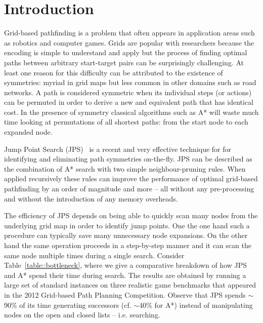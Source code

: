 \section{Introduction}
\label{sec::introduction}
Grid-based pathfinding is a problem that often
appears in application areas such as robotics and computer games. 
Grids are popular with researchers because the encoding is
simple to understand and apply but the process of finding optimal paths
between arbitrary start-target pairs can be surprisingly challenging. At least
one reason for this difficulty can be attributed to the existence of 
symmetries: myriad in grid maps but less common in other domains such as
road networks. A path is considered symmetric when its individual steps 
(or actions) can be permuted in order to derive a new and equivalent path
that has identical cost.
In the presence of symmetry classical algorithms such as A* will waste much 
time looking at permutations of all shortest paths: from the start node to each expanded node.

Jump Point Search (JPS)~\cite{harabor11b} is a recent and very effective 
technique for for identifying and eliminating path symmetries on-the-fly. 
JPS can be described as the combination of A* search with two simple 
neighbour-pruning rules. When applied recursively these rules
can improve the performance of optimal grid-based pathfinding by an order of 
magnitude and more -- all without any pre-processing and without the 
introduction of any memory overheads.



The efficiency of JPS depends on being able to quickly scan many nodes
from the underlying grid map in order to identify jump points.
One the one hand such a procedure can typically save many unnecessary
node expansions. On the other hand the same operation proceeds in a 
step-by-step manner and it can scan the same node multiple times during 
a single search. 
Consider Table~\ref{table::bottleneck}, where we give a comparative
breakdown of how JPS and A{*} spend their time during search.
The results are obtained by running
a large set of standard instances on three realistic game benchmarks
that appeared in the 2012 Grid-based Path Planning Competition. Observe that
JPS spends $\sim$90\% of its time generating successors (cf. $\sim$40\% for
A{*}) instead of manipulating nodes on the open and closed lists -- i.e.
searching.

